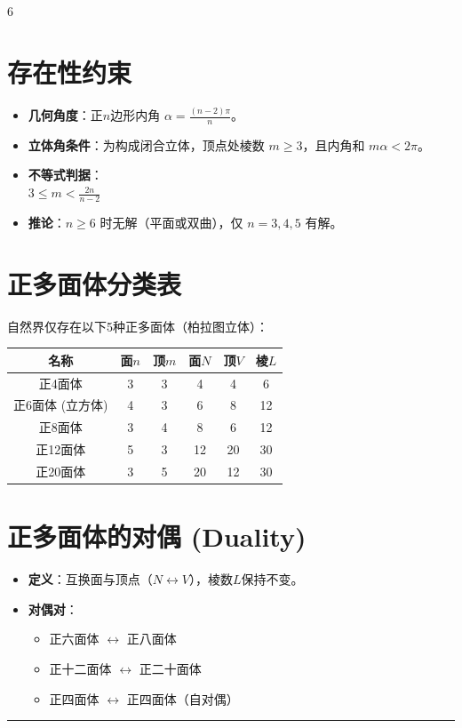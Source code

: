\documentclass[landscape]{article}
\begin{document}
\begin{multicols*}{6}
\section*{存在性约束}
\begin{itemize}
  \item \textbf{几何角度}：正$n$边形内角 $\alpha = \frac{(n-2)\pi}{n}$。
  \item \textbf{立体角条件}：为构成闭合立体，顶点处棱数 $m \ge 3$，且内角和 $m\alpha < 2\pi$。
  \item \textbf{不等式判据}：
  \\
  $
  3 \le m < \frac{2n}{n-2}
  $
  \item \textbf{推论}：$n \ge 6$ 时无解（平面或双曲），仅 $n=3,4,5$ 有解。
\end{itemize}

\section*{正多面体分类表}
自然界仅存在以下5种正多面体（柏拉图立体）：
\begin{center}
\setlength{\tabcolsep}{1pt}
\begin{tabular}{|c|cc|ccc|}
\hline
\textbf{名称} & \textbf{面$n$} & \textbf{顶$m$} & \textbf{面$N$} & \textbf{顶$V$} & \textbf{棱$L$} \\
\hline
正4面体 & 3 & 3 & 4 & 4 & 6 \\
正6面体 (立方体) & 4 & 3 & 6 & 8 & 12 \\
正8面体 & 3 & 4 & 8 & 6 & 12 \\
正12面体 & 5 & 3 & 12 & 20 & 30 \\
正20面体 & 3 & 5 & 20 & 12 & 30 \\
\hline
\end{tabular}
\end{center}

\section*{正多面体的对偶 (Duality)}
\begin{itemize}
  \item \textbf{定义}：互换面与顶点（$N \leftrightarrow V$），棱数$L$保持不变。
  \item \textbf{对偶对}：
  \begin{itemize}
      \item 正六面体 $\longleftrightarrow$ 正八面体
      \item 正十二面体 $\longleftrightarrow$ 正二十面体
      \item 正四面体 $\longleftrightarrow$ 正四面体（自对偶）
  \end{itemize}
\end{itemize}
\noindent\textcolor{red}{\rule{\linewidth}{1pt}}

\end{multicols*}
\end{document}
